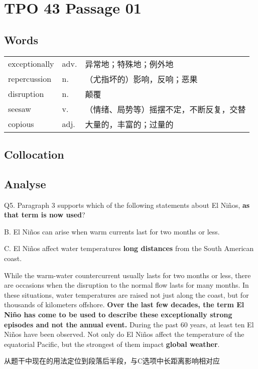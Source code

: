 \section{TPO 43 Passage 01}

\subsection{Words}

\begin{tabular}{lll}
    exceptionally & adv. & 异常地；特殊地；例外地          \\
    repercussion  & n.   & （尤指坏的）影响，反响；恶果       \\
    disruption    & n.   & 颠覆                   \\
    seesaw        & v.   & （情绪、局势等）摇摆不定，不断反复，交替 \\
    copious       & adj. & 大量的，丰富的；过量的          \\
\end{tabular}

\subsection{Collocation}


\subsection{Analyse}

\begin{blk}
    \begin{qst}
        Q5. Paragraph 3 supports which of the following statements about El Niños, \textbf{as that term is now used}?
    \end{qst}

    \begin{chc}
        B. El Niños can arise when warm currents last for two months or less.

        C. El Niños affect water temperatures \textbf{long distances} from the South American coast.
    \end{chc}

    \begin{psgq}
        While the warm-water countercurrent usually lasts for two months or less, there are occasions when the disruption to the normal flow lasts for many months. In these situations, water temperatures are raised not just along the coast, but for thousands of kilometers offshore. \textbf{Over the last few decades, the term El Niño has come to be used to describe these exceptionally strong episodes and not the annual event.} During the past 60 years, at least ten El Niños have been observed. Not only do El Niños affect the temperature of the equatorial Pacific, but the strongest of them impact \textbf{global weather}.
    \end{psgq}

    \begin{nlz}
        从题干中现在的用法定位到段落后半段，与C选项中长距离影响相对应
    \end{nlz}
\end{blk}

